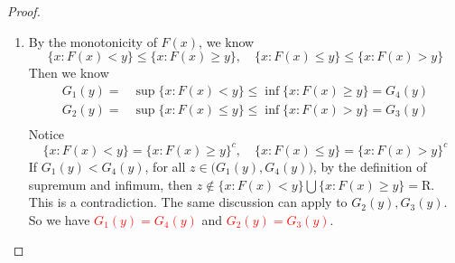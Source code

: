 \documentclass[11pt]{article}
\renewcommand{\(}{\left(}%
\renewcommand{\)}{\right)}%
\renewcommand{\[}{\left[}%
\renewcommand{\]}{\right]}%
\renewcommand{\r}{\bm{\mathrm{R}}}
\newtheorem{proof}{Proof.}}
\begin{document}
  \begin{proof}
   \begin{enumerate}[\itshape (1)]
    \item 
    By the monotonicity of $F(x)$, we know
    \begin{equation*}
     \{x:F(x)< y\}\leq \{x:F(x)\geq y\},\quad \{x:F(x)\leq  y\}\leq\{x:F(x)> y\}
    \end{equation*}
    Then we know
    \begin{equation*}
     \begin{split}
      G_1(y)=&\sup\{x:F(x)< y\}\leq \inf\{x:F(x)\geq y\}=G_4(y)\\
      G_2(y)=&\sup\{x:F(x)\leq  y\}\leq \inf\{x:F(x)> y\}=G_3(y)\\
     \end{split}
    \end{equation*}
    Notice 
    \begin{equation*}
     \{x:F(x)< y\}=\{x:F(x)\geq y\}^c,\quad \{x:F(x)\leq  y\}=\{x:F(x)> y\}^c
    \end{equation*}
    If $G_1(y)<G_4(y)$, for all $z\in \big(G_1(y),G_4(y)\big)$, by the definition of supremum and infimum, then $z\notin \{x:F(x)< y\}\bigcup \{x:F(x)\geq y\}=\r$. This is a contradiction. The same discussion can apply to $G_2(y),G_3(y)$. So we have \textcolor{red}{$G_1(y)=G_4(y)$} and \textcolor{red}{$G_2(y)=G_3(y)$}.
    

\end{enumerate}
\end{proof}
\end{document}
